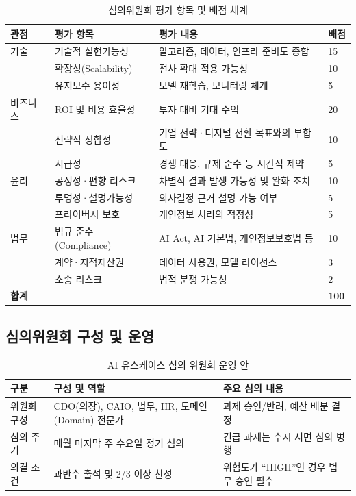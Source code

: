 \begin{table}[htbp]
\centering
\caption{심의위원회 평가 항목 및 배점 체계}
\label{tab:committee_eval_criteria}
\begin{tabularx}{\textwidth}{p{2cm}p{3.5cm}Xp{1.5cm}}
\toprule
\textbf{관점} & \textbf{평가 항목} & \textbf{평가 내용} & \textbf{배점} \\
\midrule
기술 & 기술적 실현가능성 & 알고리즘, 데이터, 인프라 준비도 종합 & 15 \\
& 확장성(Scalability) & 전사 확대 적용 가능성 & 10 \\
& 유지보수 용이성 & 모델 재학습, 모니터링 체계 & 5 \\
\midrule
비즈니스 & ROI 및 비용 효율성 & 투자 대비 기대 수익 & 20 \\
& 전략적 정합성 & 기업 전략·디지털 전환 목표와의 부합도 & 10 \\
& 시급성 & 경쟁 대응, 규제 준수 등 시간적 제약 & 5 \\
\midrule
윤리 & 공정성·편향 리스크 & 차별적 결과 발생 가능성 및 완화 조치 & 10 \\
& 투명성·설명가능성 & 의사결정 근거 설명 가능 여부 & 5 \\
& 프라이버시 보호 & 개인정보 처리의 적정성 & 5 \\
\midrule
법무 & 법규 준수(Compliance) & AI Act, AI 기본법, 개인정보보호법 등 & 10 \\
& 계약·지적재산권 & 데이터 사용권, 모델 라이선스 & 3 \\
& 소송 리스크 & 법적 분쟁 가능성 & 2 \\
\midrule
\multicolumn{3}{l}{\textbf{합계}} & \textbf{100} \\
\bottomrule
\end{tabularx}
\end{table}

\subsection{심의위원회 구성 및 운영}
\label{sec:8.4.2}

\begin{table}[htbp]
\centering
\caption{AI 유스케이스 심의 위원회 운영 안}
\label{tab:steering_committee}
\begin{tabularx}{\textwidth}{p{3cm}XX}
\toprule
\textbf{구분} & \textbf{구성 및 역할} & \textbf{주요 심의 내용} \\
\midrule
위원회 구성 & CDO(의장), CAIO, 법무, HR, 도메인(Domain) 전문가 & 과제 승인/반려, 예산 배분 결정 \\
심의 주기 & 매월 마지막 주 수요일 정기 심의 & 긴급 과제는 수시 서면 심의 병행 \\
의결 조건 & 과반수 출석 및 2/3 이상 찬성 & 위험도가 ``HIGH''인 경우 법무 승인 필수 \\
\bottomrule
\end{tabularx}
\end{table}

